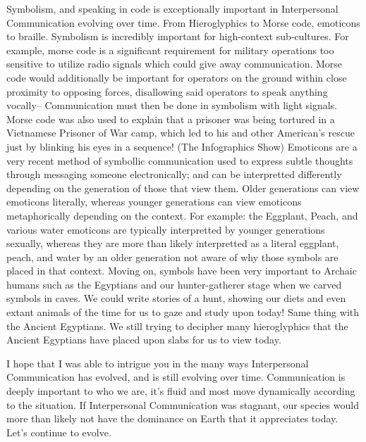\documentclass[12pt]{article}
\begin{document}
Symbolism, and speaking in code is exceptionally important in Interpersonal Communication evolving over time. From Hieroglyphics to Morse code, emoticons to braille. Symbolism is incredibly important for high-context sub-cultures. For example, morse code is a significant requirement for military operations too sensitive to utilize radio signals which could give away communication. Morse code would additionally be important for operators on the ground within close proximity to opposing forces, disallowing said operators to speak anything vocally-- Communication must then be done in symbolism with light signals. Morse code was also used to explain that a prisoner was being tortured in a Vietnamese Prisoner of War camp, which led to his and other American's rescue just by blinking his eyes in a sequence! (The Infographics Show) Emoticons are a very recent method of symbollic communication used to express subtle thoughts through messaging someone electronically; and can be interpretted differently depending on the generation of those that view them. Older generations can view emoticons literally, whereas younger generations can view emoticons metaphorically depending on the context. For example: the Eggplant, Peach, and various water emoticons are typically interpretted by younger generations sexually, whereas they are more than likely interpretted as a literal eggplant, peach, and water by an older generation not aware of why those symbols are placed in that context. Moving on, symbols have been very important to Archaic humans such as the Egyptians and our hunter-gatherer stage when we carved symbols in caves. We could write stories of a hunt, showing our diets and even extant animals of the time for us to gaze and study upon today! Same thing with the Ancient Egyptians. We still trying to decipher many hieroglyphics that the Ancient Egyptians have placed upon slabs for us to view today.
\par
I hope that I was able to intrigue you in the many ways Interpersonal Communication has evolved, and is still evolving over time. Communication is deeply important to who we are, it's fluid and most move dynamically according to the situation. If Interpersonal Communication was stagnant, our species would more than likely not have the dominance on Earth that it appreciates today. Let's continue to evolve.
\end{document}
